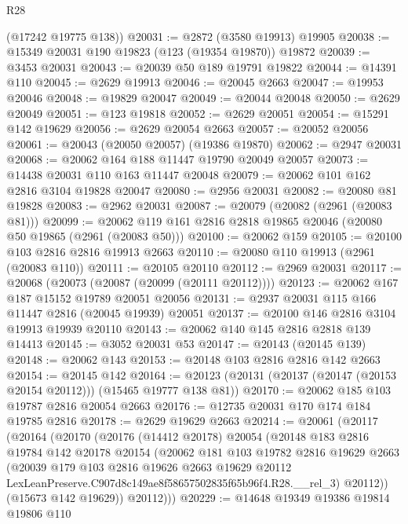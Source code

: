 \begin{lexlean}{R28}
\begin{coremodule}
      (@17242 @19775 @138))
@20031 := @2872 (@3580 @19913) @19905
@20038 := @15349 @20031 @190 @19823 (@123 (@19354 @19870)) @19872
@20039 := @3453 @20031
@20043 := @20039 @50 @189 @19791 @19822
@20044 := @14391 @110
@20045 := @2629 @19913
@20046 := @20045 @2663
@20047 := @19953 @20046
@20048 := @19829 @20047
@20049 := @20044 @20048
@20050 := @2629 @20049
@20051 := @123 @19818
@20052 := @2629 @20051
@20054 := @15291 @142 @19629
@20056 := @2629 @20054 @2663
@20057 := @20052 @20056
@20061 := @20043 (@20050 @20057) (@19386 @19870)
@20062 := @2947 @20031
@20068 := @20062 @164 @188 @11447 @19790 @20049 @20057
@20073 := @14438 @20031 @110 @163 @11447 @20048
@20079 := @20062 @101 @162 @2816 @3104 @19828 @20047
@20080 := @2956 @20031
@20082 := @20080 @81 @19828
@20083 := @2962 @20031
@20087 := @20079 (@20082 (@2961 (@20083 @81)))
@20099 := @20062 @119 @161 @2816 @2818 @19865 @20046 (@20080 @50 @19865 (@2961 (@20083 @50)))
@20100 := @20062 @159
@20105 := @20100 @103 @2816 @2816 @19913 @2663
@20110 := @20080 @110 @19913 (@2961 (@20083 @110))
@20111 := @20105 @20110
@20112 := @2969 @20031
@20117 := @20068 (@20073 (@20087 (@20099 (@20111 @20112))))
@20123 := @20062 @167 @187 @15152 @19789 @20051 @20056
@20131 := @2937 @20031 @115 @166 @11447 @2816 (@20045 @19939) @20051
@20137 := @20100 @146 @2816 @3104 @19913 @19939 @20110
@20143 := @20062 @140 @145 @2816 @2818 @139 @14413
@20145 := @3052 @20031 @53
@20147 := @20143 (@20145 @139)
@20148 := @20062 @143
@20153 := @20148 @103 @2816 @2816 @142 @2663
@20154 := @20145 @142
@20164 := @20123 (@20131 (@20137 (@20147 (@20153 @20154 @20112))) (@15465 @19777 @138 @81))
@20170 := @20062 @185 @103 @19787 @2816 @20054 @2663
@20176 := @12735 @20031 @170 @174 @184 @19785 @2816
@20178 := @2629 @19629 @2663
@20214 := @20061
    (@20117
      (@20164
        (@20170
          (@20176
            (@14412 @20178)
            @20054
            (@20148
              @183
              @2816
              @19784
              @142
              @20178
              @20154
              (@20062
                @181
                @103
                @19782
                @2816
                @19629
                @2663
                (@20039
                  @179
                  @103
                  @2816
                  @19626
                  @2663
                  @19629
                  @20112
                  LexLeanPreserve.C907d8c149ae8f58657502835f65b96f4.R28.__rel_3)
                @20112))
            (@15673 @142 @19629))
          @20112)))
@20229 := @14648
    @19349
    @19386
    @19814
    @19806
    @110

\end{coremodule}
\end{lexlean}
